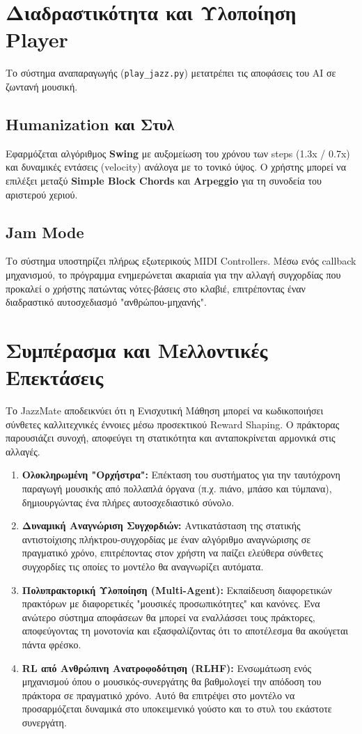 \documentclass[11pt, a4paper]{article}
\begin{document}
\section{Διαδραστικότητα και Υλοποίηση Player}

Το σύστημα αναπαραγωγής (\texttt{play\_jazz.py}) μετατρέπει τις αποφάσεις του AI σε ζωντανή μουσική.

\subsection{Humanization και Στυλ}
Εφαρμόζεται αλγόριθμος \textbf{Swing} με αυξομείωση του χρόνου των steps (1.3x / 0.7x) και δυναμικές εντάσεις (velocity) ανάλογα με το τονικό ύψος. Ο χρήστης μπορεί να επιλέξει μεταξύ \textbf{Simple Block Chords} και \textbf{Arpeggio} για τη συνοδεία του αριστερού χεριού.

\subsection{Jam Mode}
Το σύστημα υποστηρίζει πλήρως εξωτερικούς MIDI Controllers. Μέσω ενός callback μηχανισμού, το πρόγραμμα ενημερώνεται ακαριαία για την αλλαγή συγχορδίας που προκαλεί ο χρήστης πατώντας νότες-βάσεις στο κλαβιέ, επιτρέποντας έναν διαδραστικό αυτοσχεδιασμό "ανθρώπου-μηχανής".

\section{Συμπέρασμα και Μελλοντικές Επεκτάσεις}
Το JazzMate αποδεικνύει ότι η Ενισχυτική Μάθηση μπορεί να κωδικοποιήσει σύνθετες καλλιτεχνικές έννοιες μέσω προσεκτικού Reward Shaping. Ο πράκτορας παρουσιάζει συνοχή, αποφεύγει τη στατικότητα και ανταποκρίνεται αρμονικά στις αλλαγές.

\begin{enumerate}
    \item \textbf{Ολοκληρωμένη "Ορχήστρα":} Επέκταση του συστήματος για την ταυτόχρονη παραγωγή μουσικής από πολλαπλά όργανα (π.χ. πιάνο, μπάσο και τύμπανα), δημιουργώντας ένα πλήρες αυτοσχεδιαστικό σύνολο.
    \item \textbf{Δυναμική Αναγνώριση Συγχορδιών:} Αντικατάσταση της στατικής αντιστοίχισης πλήκτρου-συγχορδίας με έναν αλγόριθμο αναγνώρισης σε πραγματικό χρόνο, επιτρέποντας στον χρήστη να παίζει ελεύθερα σύνθετες συγχορδίες τις οποίες το μοντέλο θα αναγνωρίζει αυτόματα.
    \item \textbf{Πολυπρακτορική Υλοποίηση (Multi-Agent):} Εκπαίδευση διαφορετικών πρακτόρων με διαφορετικές "μουσικές προσωπικότητες" και κανόνες. Ένα ανώτερο σύστημα αποφάσεων θα μπορεί να εναλλάσσει τους πράκτορες, αποφεύγοντας τη μονοτονία και εξασφαλίζοντας ότι το αποτέλεσμα θα ακούγεται πάντα φρέσκο.
    \item \textbf{RL από Ανθρώπινη Ανατροφοδότηση (RLHF):} Ενσωμάτωση ενός μηχανισμού όπου ο μουσικός-συνεργάτης θα βαθμολογεί την απόδοση του πράκτορα σε πραγματικό χρόνο. Αυτό θα επιτρέψει στο μοντέλο να προσαρμόζεται δυναμικά στο υποκειμενικό γούστο και το στυλ του εκάστοτε συνεργάτη.
\end{enumerate}
\end{document}

